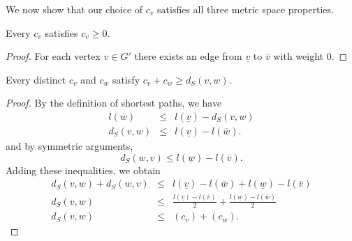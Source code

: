 \documentclass{llncs}
\begin{document}
We now show that our choice of $c_v$ satisfies all three metric space properties.

\begin{lemma}
Every $c_v$ satisfies $c_v \geq 0$.
\end{lemma}


\begin{proof}
For each vertex $v \in G'$ there exists an edge from $\underline{v}$ to $\overline{v}$ with weight 0.
\end{proof}

\begin{lemma}
Every distinct $c_v$ and $c_w$ satisfy $c_v + c_w \geq d_S(v,w).$
\end{lemma}
\begin{proof}
By the definition of shortest paths, we have
\begin{eqnarray*}
l(\overline{w}) &\leq& l(\underline{v}) - d_S(v,w) \\
d_S(v,w) &\leq& l(\underline{v}) - l(\overline{w}) .
\end{eqnarray*}
\noindent and by symmetric arguments,
\[ d_S(w,v) \leq l(\underline{w}) - l(\overline{v}). \]
\noindent Adding these inequalities, we obtain
\begin{eqnarray*}
d_S(v,w) + d_S(w,v) &\leq& l(\underline{v}) - l(\overline{w}) + l(\underline{w}) - l(\overline{v}) \\
d_S(v,w) &\leq& \frac{l(\underline{v}) - l(\overline{v})}{2} + \frac{l(\underline{w}) - l(\overline{w})}{2} \\ 
d_S(v,w) &\leq& (c_v) + (c_w) .
\end{eqnarray*}
\end{proof}
\end{document}
